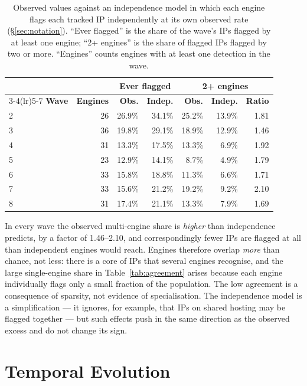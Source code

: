 \begin{table}[h]
  \centering
  \caption{Observed values against an independence model in which each engine flags each tracked IP
    independently at its own observed rate (\S\ref{sec:notation}). ``Ever flagged'' is the share of
    the wave's IPs flagged by at least one engine; ``2+ engines'' is the share of flagged IPs
    flagged by two or more. ``Engines'' counts engines with at least one detection in the wave.}
  \label{tab:agreement_chance}
  \small
  \begin{tabular}{lrrrrrr}
    \toprule
    & & \multicolumn{2}{c}{\textbf{Ever flagged}} & \multicolumn{3}{c}{\textbf{2+ engines}} \\
    \cmidrule(lr){3-4}\cmidrule(lr){5-7}
    \textbf{Wave} & \textbf{Engines} & \textbf{Obs.} & \textbf{Indep.} & \textbf{Obs.} & \textbf{Indep.} & \textbf{Ratio} \\
    \midrule
    2 & 26 & 26.9\% & 34.1\% & 25.2\% & 13.9\% & 1.81 \\
    3 & 36 & 19.8\% & 29.1\% & 18.9\% & 12.9\% & 1.46 \\
    4 & 31 & 13.3\% & 17.5\% & 13.3\% &  6.9\% & 1.92 \\
    5 & 23 & 12.9\% & 14.1\% &  8.7\% &  4.9\% & 1.79 \\
    6 & 33 & 15.8\% & 18.8\% & 11.3\% &  6.6\% & 1.71 \\
    7 & 33 & 15.6\% & 21.2\% & 19.2\% &  9.2\% & 2.10 \\
    8 & 31 & 17.4\% & 21.1\% & 13.3\% &  7.9\% & 1.69 \\
    \bottomrule
  \end{tabular}
\end{table}

In every wave the observed multi-engine share is \emph{higher} than independence predicts, by a
factor of 1.46--2.10, and correspondingly fewer IPs are flagged at all than independent engines would
reach. Engines therefore overlap \emph{more} than chance, not less: there is a core of IPs that
several engines recognise, and the large single-engine share in Table~\ref{tab:agreement} arises
because each engine individually flags only a small fraction of the population. The low agreement is
a consequence of sparsity, not evidence of specialisation. The independence model is a
simplification --- it ignores, for example, that IPs on shared hosting may be flagged together --- but
such effects push in the same direction as the observed excess and do not change its sign.

\section{Temporal Evolution}
\label{sec:temporal}

